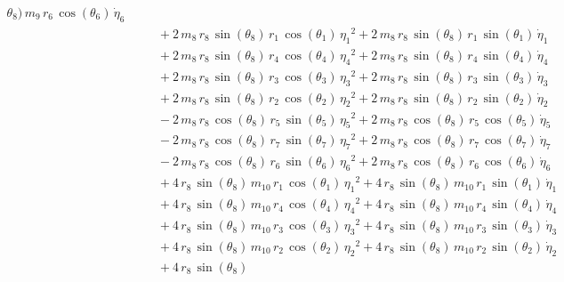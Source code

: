 \begin{eqnarray*}
{\theta_{8}})\,m_{9}\,r_{6}\,\cos({\theta_{6}})\,{\dot{\eta}_{6}}
 \\ &&\quad\mbox{} + 2\,m_{8}\,r_{8}\,\sin({\theta_{8}})\,r_{1}\,\cos(
{\theta_{1}})\,{{\eta_{1}}}^2 + 2\,m_{8}\,r_{8}\,\sin({\theta_{8}})\,r
_{1}\,\sin({\theta_{1}})\,{\dot{\eta}_{1}} \\ &&\quad\mbox{} + 2\,m_{8
}\,r_{8}\,\sin({\theta_{8}})\,r_{4}\,\cos({\theta_{4}})\,{{\eta_{4}}}^
2 + 2\,m_{8}\,r_{8}\,\sin({\theta_{8}})\,r_{4}\,\sin({\theta_{4}})\,{
\dot{\eta}_{4}} \\ &&\quad\mbox{} + 2\,m_{8}\,r_{8}\,\sin({\theta_{8}}
)\,r_{3}\,\cos({\theta_{3}})\,{{\eta_{3}}}^2 + 2\,m_{8}\,r_{8}\,\sin({
\theta_{8}})\,r_{3}\,\sin({\theta_{3}})\,{\dot{\eta}_{3}}
 \\ &&\quad\mbox{} + 2\,m_{8}\,r_{8}\,\sin({\theta_{8}})\,r_{2}\,\cos(
{\theta_{2}})\,{{\eta_{2}}}^2 + 2\,m_{8}\,r_{8}\,\sin({\theta_{8}})\,r
_{2}\,\sin({\theta_{2}})\,{\dot{\eta}_{2}} \\ &&\quad\mbox{} - 2\,m_{8
}\,r_{8}\,\cos({\theta_{8}})\,r_{5}\,\sin({\theta_{5}})\,{{\eta_{5}}}^
2 + 2\,m_{8}\,r_{8}\,\cos({\theta_{8}})\,r_{5}\,\cos({\theta_{5}})\,{
\dot{\eta}_{5}} \\ &&\quad\mbox{} - 2\,m_{8}\,r_{8}\,\cos({\theta_{8}}
)\,r_{7}\,\sin({\theta_{7}})\,{{\eta_{7}}}^2 + 2\,m_{8}\,r_{8}\,\cos({
\theta_{8}})\,r_{7}\,\cos({\theta_{7}})\,{\dot{\eta}_{7}}
 \\ &&\quad\mbox{} - 2\,m_{8}\,r_{8}\,\cos({\theta_{8}})\,r_{6}\,\sin(
{\theta_{6}})\,{{\eta_{6}}}^2 + 2\,m_{8}\,r_{8}\,\cos({\theta_{8}})\,r
_{6}\,\cos({\theta_{6}})\,{\dot{\eta}_{6}} \\ &&\quad\mbox{} + 4\,r_{8
}\,\sin({\theta_{8}})\,m_{10}\,r_{1}\,\cos({\theta_{1}})\,{{\eta_{1}}}
^2 + 4\,r_{8}\,\sin({\theta_{8}})\,m_{10}\,r_{1}\,\sin({\theta_{1}})\,
{\dot{\eta}_{1}} \\ &&\quad\mbox{} + 4\,r_{8}\,\sin({\theta_{8}})\,m_{
10}\,r_{4}\,\cos({\theta_{4}})\,{{\eta_{4}}}^2 + 4\,r_{8}\,\sin({
\theta_{8}})\,m_{10}\,r_{4}\,\sin({\theta_{4}})\,{\dot{\eta}_{4}}
 \\ &&\quad\mbox{} + 4\,r_{8}\,\sin({\theta_{8}})\,m_{10}\,r_{3}\,\cos
({\theta_{3}})\,{{\eta_{3}}}^2 + 4\,r_{8}\,\sin({\theta_{8}})\,m_{10}
\,r_{3}\,\sin({\theta_{3}})\,{\dot{\eta}_{3}} \\ &&\quad\mbox{} + 4\,r
_{8}\,\sin({\theta_{8}})\,m_{10}\,r_{2}\,\cos({\theta_{2}})\,{{\eta_{2
}}}^2 + 4\,r_{8}\,\sin({\theta_{8}})\,m_{10}\,r_{2}\,\sin({\theta_{2}}
)\,{\dot{\eta}_{2}} \\ &&\quad\mbox{} + 4\,r_{8}\,\sin({\theta_{8}})\,

\end{eqnarray*}
